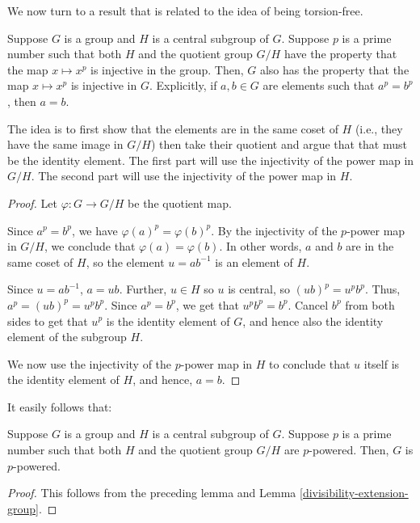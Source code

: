 \documentclass{ucetd}
\begin{document}
We now turn to a result that is related to the idea of being torsion-free.

\begin{lemma}\label{powering-injective-extension-group}
  Suppose $G$ is a group and $H$ is a central subgroup of $G$. Suppose
  $p$ is a prime number such that both $H$ and the quotient group
  $G/H$ have the property that the map $x \mapsto x^p$ is injective in
  the group. Then, $G$ also has the property that the map $x \mapsto
  x^p$ is injective in $G$. Explicitly, if $a,b \in G$ are elements
  such that $a^p = b^p$, then $a = b$.
\end{lemma}

The idea is to first show that the elements are in the same coset of
$H$ (i.e., they have the same image in $G/H$) then take their quotient
and argue that that must be the identity element. The first part will
use the injectivity of the power map in $G/H$. The second part will
use the injectivity of the power map in $H$.

\begin{proof}
  Let $\varphi: G \to G/H$ be the quotient map.

  Since $a^p = b^p$, we have $\varphi(a)^p = \varphi(b)^p$. By the injectivity
  of the $p$-power map in $G/H$, we conclude that $\varphi(a) =
  \varphi(b)$. In other words, $a$ and $b$ are in the same coset of $H$,
  so the element $u = ab^{-1}$ is an element of $H$.

  Since $u = ab^{-1}$, $a = ub$. Further, $u \in H$ so $u$ is central,
  so $(ub)^p = u^pb^p$. Thus, $a^p = (ub)^p = u^pb^p$. Since $a^p =
  b^p$, we get that $u^pb^p = b^p$. Cancel $b^p$ from both sides to
  get that $u^p$ is the identity element of $G$, and hence also the
  identity element of the subgroup $H$.

  We now use the injectivity of the $p$-power map in $H$ to conclude
  that $u$ itself is the identity element of $H$, and hence, $a = b$.
\end{proof}

It easily follows that:

\begin{lemma}\label{lemma:powering-extension-group}
  Suppose $G$ is a group and $H$ is a central subgroup of $G$. Suppose
  $p$ is a prime number such that both $H$ and the quotient group
  $G/H$ are $p$-powered. Then, $G$ is $p$-powered.
\end{lemma}

\begin{proof}
  This follows from the preceding lemma and Lemma \ref{divisibility-extension-group}.
\end{proof}
\end{document}
